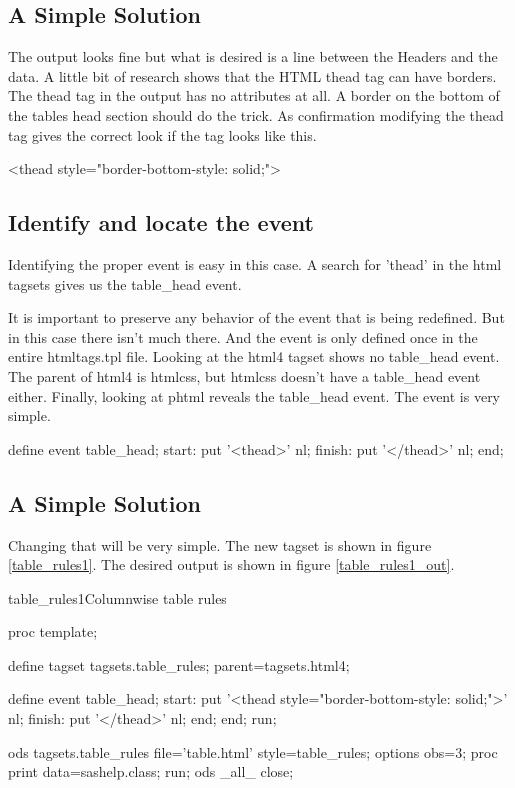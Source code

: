 \subsection{A Simple Solution}
The output looks fine but what is desired is a line between the
Headers and the data.  A little bit of research shows that the
HTML thead tag can have borders.  The thead tag in the output
has no attributes at all.  A border on the bottom
of the tables head section should do the trick.  As confirmation
modifying the thead tag gives the correct look if the
tag looks like this.
\begin{sfvoutput}
<thead style="border-bottom-style: solid;">
\end{sfvoutput}

\subsection{Identify and locate the event}
Identifying the proper event is easy in this case.
A search for 'thead' in the html tagsets gives us the table\_head event.

It is important to preserve any behavior of the event that is being
redefined.  But in this case there isn't much there.  And the event
is only defined once in the entire htmltags.tpl file.
Looking at the html4 tagset shows no table\_head event.
The parent of html4 is htmlcss, but htmlcss doesn't have a table\_head
event either.  Finally, looking at phtml reveals the table\_head event.
The event is very simple.

\begin{sfvcode}
        define event table_head;
            start:
                put '<thead>' nl;
            finish:
                put '</thead>' nl;
        end;
\end{sfvcode}

\subsection{A Simple Solution}
Changing that will be very simple. The new tagset is shown 
in figure \vref{table_rules1}.
The desired output is shown 
in figure \vref{table_rules1_out}.

\begin{fvcode}{table_rules1}{Columnwise table rules}

proc template;

    define tagset tagsets.table_rules;
        parent=tagsets.html4;

        define event table_head;
            start:
                put '<thead style="border-bottom-style: solid;">' nl;
            finish:
                put '</thead>' nl;
        end;
    end;
run;

ods tagsets.table_rules file='table.html' style=table_rules;
options obs=3;
proc print data=sashelp.class; run;
ods _all_ close;
\end{fvcode}

